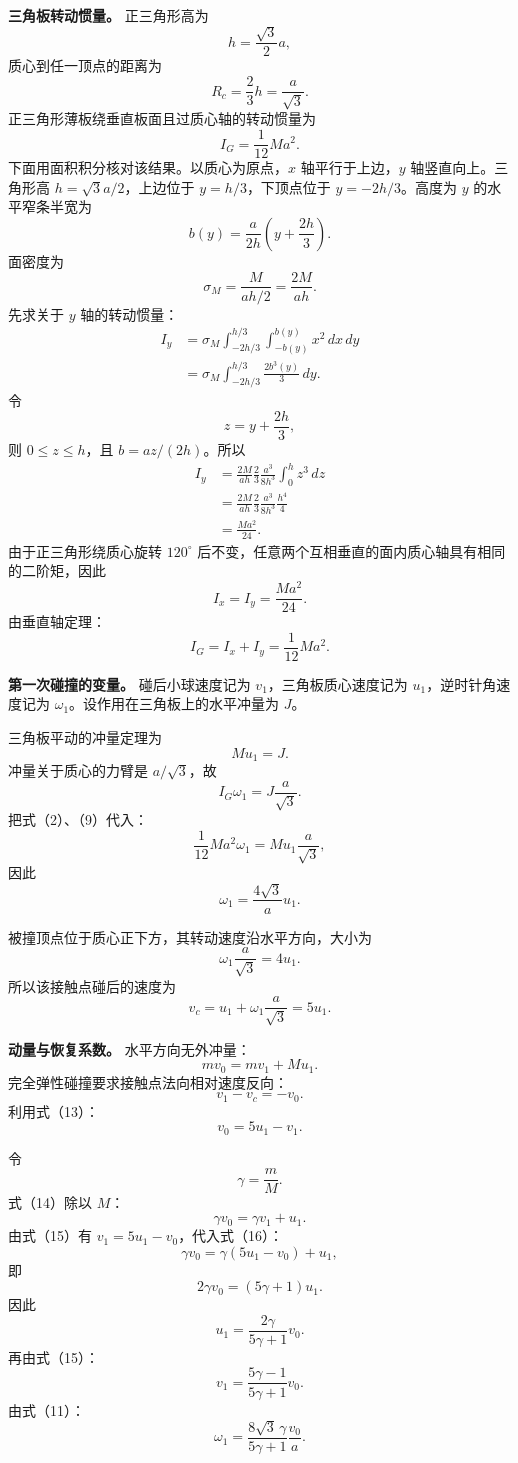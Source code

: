 \documentclass[12pt,a4paper,UTF8]{ctexart}
\begin{document}
\textbf{三角板转动惯量。} 正三角形高为 \[
h=\frac{\sqrt3}{2}a,
\] 质心到任一顶点的距离为 \[
R_c=\frac23h=\frac a{\sqrt3}. \tag{1}
\] 正三角形薄板绕垂直板面且过质心轴的转动惯量为 \[
I_G=\frac1{12}Ma^2. \tag{2}
\] 下面用面积积分核对该结果。以质心为原点，\(x\) 轴平行于上边，\(y\)
轴竖直向上。三角形高 \(h=\sqrt3a/2\)，上边位于 \(y=h/3\)，下顶点位于
\(y=-2h/3\)。高度为 \(y\) 的水平窄条半宽为 \[
b(y)=\frac{a}{2h}\left(y+\frac{2h}{3}\right). \tag{3}
\] 面密度为 \[
\sigma_M=\frac{M}{ah/2}=\frac{2M}{ah}. \tag{4}
\] 先求关于 \(y\) 轴的转动惯量： \[
\begin{aligned}
I_y
&=\sigma_M
\int_{-2h/3}^{h/3}
\int_{-b(y)}^{b(y)}x^2\,dx\,dy\\
&=\sigma_M
\int_{-2h/3}^{h/3}
\frac{2b^3(y)}3\,dy.
\end{aligned} \tag{5}
\] 令 \[
z=y+\frac{2h}{3},
\] 则 \(0\leqslant z\leqslant h\)，且 \(b=az/(2h)\)。所以 \[
\begin{aligned}
I_y
&=\frac{2M}{ah}\frac23
\frac{a^3}{8h^3}
\int_0^h z^3\,dz\\
&=\frac{2M}{ah}\frac23
\frac{a^3}{8h^3}\frac{h^4}{4}\\
&=\frac{Ma^2}{24}.
\end{aligned} \tag{6}
\] 由于正三角形绕质心旋转 \(120^\circ\)
后不变，任意两个互相垂直的面内质心轴具有相同的二阶矩，因此 \[
I_x=I_y=\frac{Ma^2}{24}. \tag{7}
\] 由垂直轴定理： \[
I_G=I_x+I_y=\frac1{12}Ma^2. \tag{8}
\]

\textbf{第一次碰撞的变量。} 碰后小球速度记为 \(v_1\)，三角板质心速度记为
\(u_1\)，逆时针角速度记为 \(\omega_1\)。设作用在三角板上的水平冲量为
\(J\)。

三角板平动的冲量定理为 \[
Mu_1=J. \tag{9}
\] 冲量关于质心的力臂是 \(a/\sqrt3\)，故 \[
I_G\omega_1=J\frac a{\sqrt3}. \tag{10}
\] 把式（2）、（9）代入： \[
\frac1{12}Ma^2\omega_1
=Mu_1\frac a{\sqrt3},
\] 因此 \[
\boxed{\omega_1=\frac{4\sqrt3}{a}u_1}. \tag{11}
\]

被撞顶点位于质心正下方，其转动速度沿水平方向，大小为 \[
\omega_1\frac a{\sqrt3}=4u_1. \tag{12}
\] 所以该接触点碰后的速度为 \[
v_c=u_1+\omega_1\frac a{\sqrt3}=5u_1. \tag{13}
\]

\textbf{动量与恢复系数。} 水平方向无外冲量： \[
mv_0=mv_1+Mu_1. \tag{14}
\] 完全弹性碰撞要求接触点法向相对速度反向： \[
v_1-v_c=-v_0.
\] 利用式（13）： \[
v_0=5u_1-v_1. \tag{15}
\]

令 \[
\gamma=\frac mM.
\] 式（14）除以 \(M\)： \[
\gamma v_0=\gamma v_1+u_1. \tag{16}
\] 由式（15）有 \(v_1=5u_1-v_0\)，代入式（16）： \[
\gamma v_0
=\gamma(5u_1-v_0)+u_1,
\] 即 \[
2\gamma v_0=(5\gamma+1)u_1.
\] 因此 \[
\boxed{
u_1=\frac{2\gamma}{5\gamma+1}v_0
}. \tag{17}
\] 再由式（15）： \[
\boxed{
v_1=\frac{5\gamma-1}{5\gamma+1}v_0
}. \tag{18}
\] 由式（11）： \[
\boxed{
\omega_1
=\frac{8\sqrt3\,\gamma}{5\gamma+1}\frac{v_0}{a}
}. \tag{19}
\]
\end{document}
